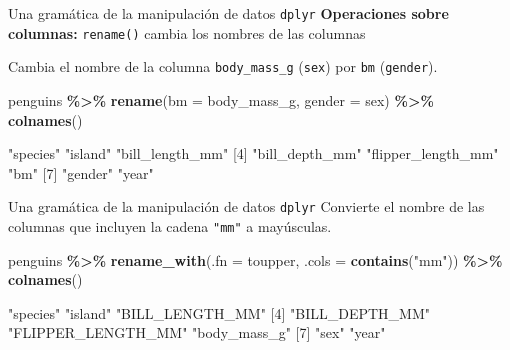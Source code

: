 \documentclass[
  ignorenonframetext,
  aspectratio=169]{beamer}
\newenvironment{Shaded}{\begin{snugshade}}{\end{snugshade}}
\newcommand{\AttributeTok}[1]{\textcolor[rgb]{0.13,0.29,0.53}{#1}}
\newcommand{\FunctionTok}[1]{\textcolor[rgb]{0.13,0.29,0.53}{\textbf{#1}}}
\newcommand{\NormalTok}[1]{#1}
\newcommand{\SpecialCharTok}[1]{\textcolor[rgb]{0.81,0.36,0.00}{\textbf{#1}}}
\newcommand{\StringTok}[1]{\textcolor[rgb]{0.31,0.60,0.02}{#1}}
\let\oldverbatim\verbatim
\let\endoldverbatim\endverbatim
\renewenvironment{verbatim}{\tiny\oldverbatim}{\endoldverbatim}
\begin{document}
\begin{frame}[fragile]{Una gramática de la manipulación de datos
\texttt{dplyr}}
\label{una-gramuxe1tica-de-la-manipulaciuxf3n-de-datos-dplyr-17}
\textbf{Operaciones sobre columnas:} \texttt{rename()} cambia los
nombres de las columnas

Cambia el nombre de la columna \texttt{body\_mass\_g} (\texttt{sex}) por
\texttt{bm} (\texttt{gender}).

\begin{Shaded}
\begin{Highlighting}[]
\NormalTok{penguins }\SpecialCharTok{\%\textgreater{}\%} \FunctionTok{rename}\NormalTok{(}\AttributeTok{bm =}\NormalTok{ body\_mass\_g, }\AttributeTok{gender =}\NormalTok{ sex) }\SpecialCharTok{\%\textgreater{}\%}
  \FunctionTok{colnames}\NormalTok{()}
\end{Highlighting}
\end{Shaded}

\begin{verbatim}
[1] "species"           "island"            "bill_length_mm"   
[4] "bill_depth_mm"     "flipper_length_mm" "bm"               
[7] "gender"            "year"             
\end{verbatim}
\end{frame}

\begin{frame}[fragile]{Una gramática de la manipulación de datos
\texttt{dplyr}}
\label{una-gramuxe1tica-de-la-manipulaciuxf3n-de-datos-dplyr-18}
Convierte el nombre de las columnas que incluyen la cadena \texttt{"mm"}
a mayúsculas.

\begin{Shaded}
\begin{Highlighting}[]
\NormalTok{penguins }\SpecialCharTok{\%\textgreater{}\%} \FunctionTok{rename\_with}\NormalTok{(}\AttributeTok{.fn =}\NormalTok{ toupper, }\AttributeTok{.cols =} \FunctionTok{contains}\NormalTok{(}\StringTok{"mm"}\NormalTok{)) }\SpecialCharTok{\%\textgreater{}\%} 
  \FunctionTok{colnames}\NormalTok{()}
\end{Highlighting}
\end{Shaded}

\begin{verbatim}
[1] "species"           "island"            "BILL_LENGTH_MM"   
[4] "BILL_DEPTH_MM"     "FLIPPER_LENGTH_MM" "body_mass_g"      
[7] "sex"               "year"             
\end{verbatim}
\end{frame}
\end{document}
